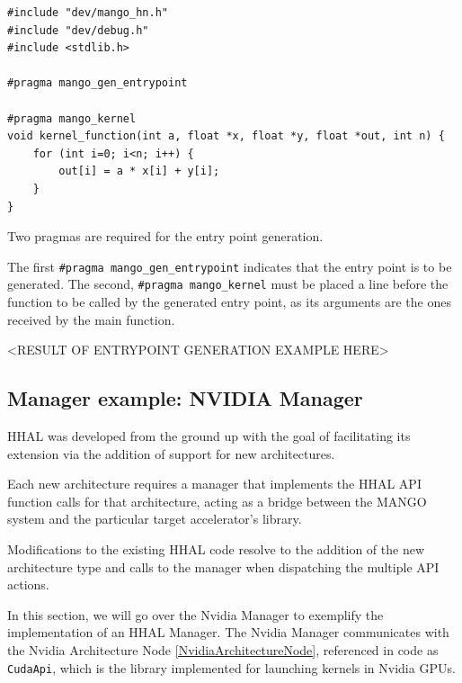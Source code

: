\begin{lstlisting}[style=CStyle, caption=HHAL Dynamic Compiler - Kernel source annotation sample]
#include "dev/mango_hn.h"
#include "dev/debug.h"
#include <stdlib.h>

#pragma mango_gen_entrypoint

#pragma mango_kernel
void kernel_function(int a, float *x, float *y, float *out, int n) {
    for (int i=0; i<n; i++) {
	    out[i] = a * x[i] + y[i];
    }
}
\end{lstlisting}

Two pragmas are required for the entry point generation. 

The first \texttt{\#pragma mango\_gen\_entrypoint} indicates that the entry point is to be generated. The second, \texttt{\#pragma mango\_kernel} must be placed a line before the function to be called by the generated entry point, as its arguments are the ones received by the main function.

<RESULT OF ENTRYPOINT GENERATION EXAMPLE HERE>

\subsection{Manager example: NVIDIA Manager}

HHAL was developed from the ground up with the goal of facilitating its extension via the addition of support for new architectures.

Each new architecture requires a manager that implements the HHAL API function calls for that architecture, acting as a bridge between the MANGO system and the particular target accelerator's library.

Modifications to the existing HHAL code resolve to the addition of the new architecture type and calls to the manager when dispatching the multiple API actions.

In this section, we will go over the Nvidia Manager to exemplify the implementation of an HHAL Manager. The Nvidia Manager communicates with the Nvidia Architecture Node \ref{NvidiaArchitectureNode}, referenced in code as \texttt{CudaApi}, which is the library implemented for launching kernels in Nvidia GPUs.

